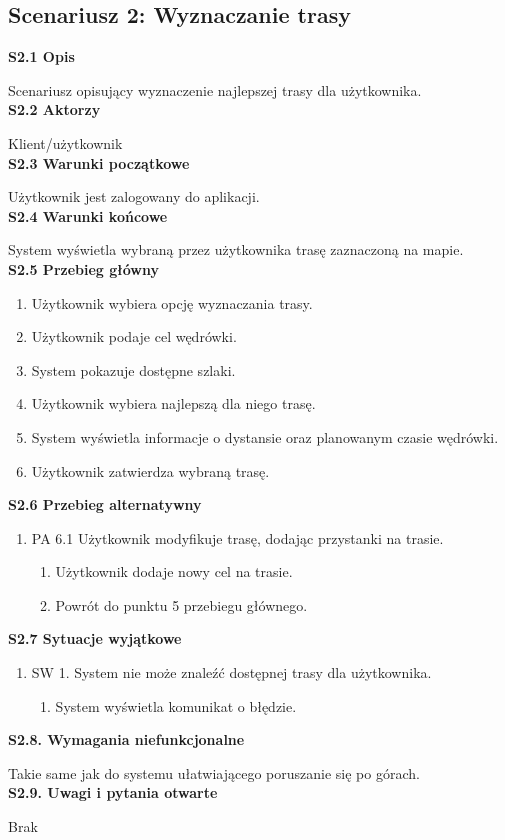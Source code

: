     \subsection*{Scenariusz 2: Wyznaczanie trasy}
    \noindent
    \textbf{S2.1 Opis} \par
    Scenariusz opisujący wyznaczenie najlepszej trasy dla użytkownika. \\
    \textbf{S2.2 Aktorzy} \par
    Klient/użytkownik \\
    \textbf{S2.3 Warunki początkowe} \par
    Użytkownik jest zalogowany do aplikacji. \\
    \textbf{S2.4 Warunki końcowe} \par
    System wyświetla wybraną przez użytkownika trasę zaznaczoną na mapie. \\
    \textbf{S2.5 Przebieg główny}
    \begin{enumerate}
        \item Użytkownik wybiera opcję wyznaczania trasy.
        \item Użytkownik podaje cel wędrówki.
        \item System pokazuje dostępne szlaki.
        \item Użytkownik wybiera najlepszą dla niego trasę.
        \item System wyświetla informacje o dystansie oraz planowanym czasie wędrówki.
        \item Użytkownik zatwierdza wybraną trasę.
    \end{enumerate}
    \textbf{S2.6 Przebieg alternatywny}
    \begin{enumerate}
        \item[] PA 6.1 Użytkownik modyfikuje trasę, dodając przystanki na trasie.
        \begin{enumerate}
            \item Użytkownik dodaje nowy cel na trasie.
            \item Powrót do punktu 5 przebiegu głównego.
        \end{enumerate}
    \end{enumerate}
    \textbf{S2.7 Sytuacje wyjątkowe} \par
    \begin{enumerate}
        \item []SW 1. System nie może znaleźć dostępnej trasy dla użytkownika.
        \begin{enumerate}
            \item System wyświetla komunikat o błędzie.
        \end{enumerate}
    \end{enumerate}
    \textbf{S2.8. Wymagania niefunkcjonalne} \par
    Takie same jak do systemu ułatwiającego poruszanie się po górach. \\
    \textbf{S2.9. Uwagi i pytania otwarte} \par
    Brak 

